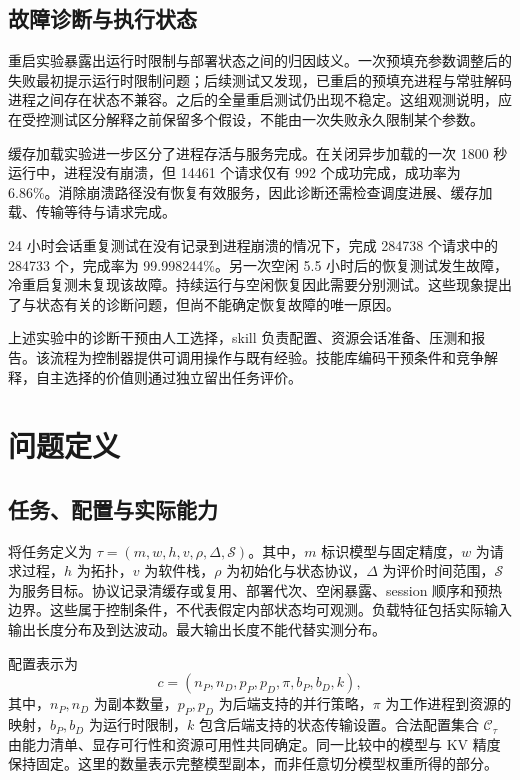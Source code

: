\documentclass[preprint,12pt]{elsarticle}
\begin{document}
\subsection{故障诊断与执行状态}
重启实验暴露出运行时限制与部署状态之间的归因歧义。一次预填充参数调整后的失败最初提示运行时限制问题；后续测试又发现，已重启的预填充进程与常驻解码进程之间存在状态不兼容。之后的全量重启测试仍出现不稳定。这组观测说明，应在受控测试区分解释之前保留多个假设，不能由一次失败永久限制某个参数。

缓存加载实验进一步区分了进程存活与服务完成。在关闭异步加载的一次 1800 秒运行中，进程没有崩溃，但 14461 个请求仅有 992 个成功完成，成功率为 6.86\%。消除崩溃路径没有恢复有效服务，因此诊断还需检查调度进展、缓存加载、传输等待与请求完成。

24 小时会话重复测试在没有记录到进程崩溃的情况下，完成 284738 个请求中的 284733 个，完成率为 99.998244\%。另一次空闲 5.5 小时后的恢复测试发生故障，冷重启复测未复现该故障。持续运行与空闲恢复因此需要分别测试。这些现象提出了与状态有关的诊断问题，但尚不能确定恢复故障的唯一原因。

上述实验中的诊断干预由人工选择，skill 负责配置、资源会话准备、压测和报告。该流程为控制器提供可调用操作与既有经验。技能库编码干预条件和竞争解释，自主选择的价值则通过独立留出任务评价。

\section{问题定义}
\subsection{任务、配置与实际能力}
将任务定义为 $\tau=(m,w,h,v,\rho,\Delta,\mathcal{S})$。其中，$m$ 标识模型与固定精度，$w$ 为请求过程，$h$ 为拓扑，$v$ 为软件栈，$\rho$ 为初始化与状态协议，$\Delta$ 为评价时间范围，$\mathcal{S}$ 为服务目标。协议记录清缓存或复用、部署代次、空闲暴露、session 顺序和预热边界。这些属于控制条件，不代表假定内部状态均可观测。负载特征包括实际输入输出长度分布及到达波动。最大输出长度不能代替实测分布。

配置表示为
\begin{equation}
 c=(n_P,n_D,p_P,p_D,\pi,b_P,b_D,k),
\end{equation}
其中，$n_P,n_D$ 为副本数量，$p_P,p_D$ 为后端支持的并行策略，$\pi$ 为工作进程到资源的映射，$b_P,b_D$ 为运行时限制，$k$ 包含后端支持的状态传输设置。合法配置集合 $\mathcal{C}_{\tau}$ 由能力清单、显存可行性和资源可用性共同确定。同一比较中的模型与 KV 精度保持固定。这里的数量表示完整模型副本，而非任意切分模型权重所得的部分。
\end{document}

